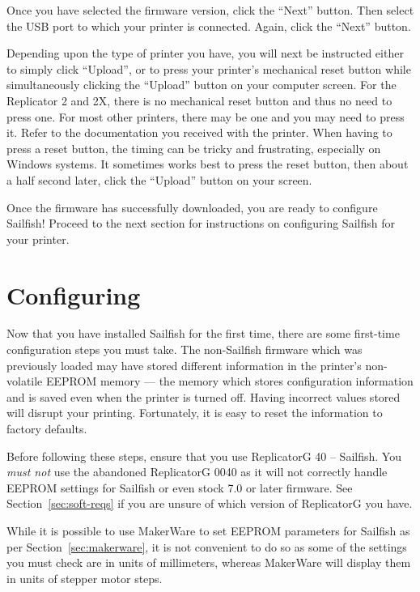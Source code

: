 Once you have selected the firmware version, click the ``Next'' button.
Then select the USB port to which your printer is connected.  Again, click the
``Next'' button.

Depending upon the type of printer you have, you will next be instructed
either to simply click ``Upload'', or to press your printer's mechanical reset button
while simultaneously clicking the ``Upload'' button on your computer screen.
For the Replicator 2 and 2X, there is no mechanical reset button and thus
no need to press one.  For most other printers, there may be one and you may
need to press it.  Refer to the documentation you received with the printer.
When having to press a reset button, the timing can be tricky and frustrating,
especially on Windows systems.  It sometimes works best to press the reset
button, then about a half second later, click the ``Upload'' button
on your screen.

Once the firmware has successfully downloaded, you are ready to
configure Sailfish!
\ifpdf
\else
Proceed to the next section for instructions on configuring Sailfish for your printer.
\fi


\section{Configuring}

Now that you have installed Sailfish for the first time, there are some
first-time configuration steps you must take.  The non-Sailfish firmware
which was previously loaded may have stored different information in
the printer's non-volatile \gls{EEPROM} memory --- the memory which stores
configuration information and is saved even when the printer is turned off.
Having incorrect values stored will disrupt your printing.  Fortunately,
it is easy to reset the information to factory defaults.

Before following these steps, ensure that you use ReplicatorG 40 -- Sailfish.
You \emph{must not} use the abandoned ReplicatorG 0040 as it will not
correctly handle EEPROM settings for Sailfish or even stock 7.0 or later
firmware.  See Section~\ref{sec:soft-reqs} if you are unsure of which version
of ReplicatorG you have.

While it is possible to use MakerWare to set EEPROM parameters for
Sailfish as per Section~\ref{sec:makerware}, it is not convenient to
do so as some of the settings you must check are in units of
millimeters, whereas MakerWare will display them in units of stepper motor
steps.

